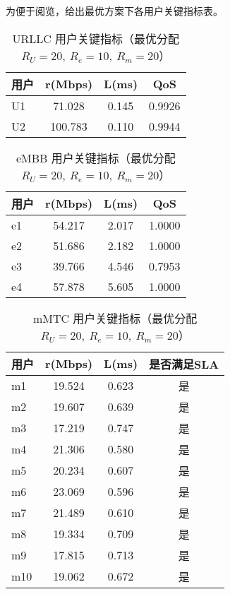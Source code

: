 为便于阅览，给出最优方案下各用户关键指标表。

\begin{table}[htbp]
  \centering
  \small
  \caption{URLLC 用户关键指标（最优分配 $R_U=20,\ R_e=10,\ R_m=20$）}
  \begin{tabular}{lccc}
    \hline
    用户 & r(Mbps) & L(ms) & QoS \\
    \hline
    U1 & 71.028 & 0.145 & 0.9926 \\
    U2 & 100.783 & 0.110 & 0.9944 \\
    \hline
  \end{tabular}
\end{table}

\begin{table}[htbp]
  \centering
  \small
  \caption{eMBB 用户关键指标（最优分配 $R_U=20,\ R_e=10,\ R_m=20$）}
  \begin{tabular}{lccc}
    \hline
    用户 & r(Mbps) & L(ms) & QoS \\
    \hline
    e1 & 54.217 & 2.017 & 1.0000 \\
    e2 & 51.686 & 2.182 & 1.0000 \\
    e3 & 39.766 & 4.546 & 0.7953 \\
    e4 & 57.878 & 5.605 & 1.0000 \\
    \hline
  \end{tabular}
\end{table}

\begin{table}[htbp]
  \centering
  \small
  \caption{mMTC 用户关键指标（最优分配 $R_U=20,\ R_e=10,\ R_m=20$）}
  \begin{tabular}{lccc}
    \hline
    用户 & r(Mbps) & L(ms) & 是否满足SLA \\
    \hline
    m1 & 19.524 & 0.623 & 是 \\
    m2 & 19.607 & 0.639 & 是 \\
    m3 & 17.219 & 0.747 & 是 \\
    m4 & 21.306 & 0.580 & 是 \\
    m5 & 20.234 & 0.607 & 是 \\
    m6 & 23.069 & 0.596 & 是 \\
    m7 & 21.489 & 0.610 & 是 \\
    m8 & 19.334 & 0.709 & 是 \\
    m9 & 17.815 & 0.713 & 是 \\
    m10 & 19.062 & 0.672 & 是 \\
    \hline
  \end{tabular}
\end{table}
